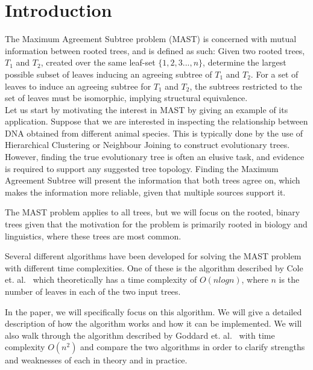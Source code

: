 \chapter{Introduction}
\label{ch:intro}
The Maximum Agreement Subtree problem (MAST) is concerned with mutual information between rooted trees, and is defined as such: Given two rooted trees, $T_1$ and $T_2$, created over the same leaf-set $\{1,2,3...,n\}$, determine the largest possible subset of leaves inducing an agreeing subtree of $T_1$ and $T_2$. For a set of leaves to induce an agreeing subtree for $T_1$ and $T_2$, the subtrees restricted to the set of leaves must be isomorphic, implying structural equivalence.
\\

Let us start by motivating the interest in MAST by giving an example of its application. Suppose that we are interested in inspecting the relationship between DNA obtained from different animal species. This is typically done by the use of  Hierarchical Clustering or Neighbour Joining to construct evolutionary trees. However, finding the true evolutionary tree is often an elusive task, and evidence is required to support any suggested tree topology. Finding the Maximum Agreement Subtree will present the information that both trees agree on, which makes the information more reliable, given that multiple sources support it. 

The MAST problem applies to all trees, but we will focus on the rooted, binary trees given that the motivation for the problem is primarily rooted in biology and linguistics, where these trees are most common.

Several different algorithms have been developed for solving the MAST problem with different time complexities. One of these is the algorithm described by Cole et. al.\ \cite{nlogn} which theoretically has a time complexity of $O(nlogn)$, where $n$ is the number of leaves in each of the two input trees.

In the paper, we will specifically focus on this algorithm. We will give a detailed description of how the algorithm works and how it can be implemented. We will also walk through the algorithm described by Goddard et. al.\ \cite{nsquared} with time complexity $O(n^2)$ and compare the two algorithms in order to clarify strengths and weaknesses of each in theory and in practice.

